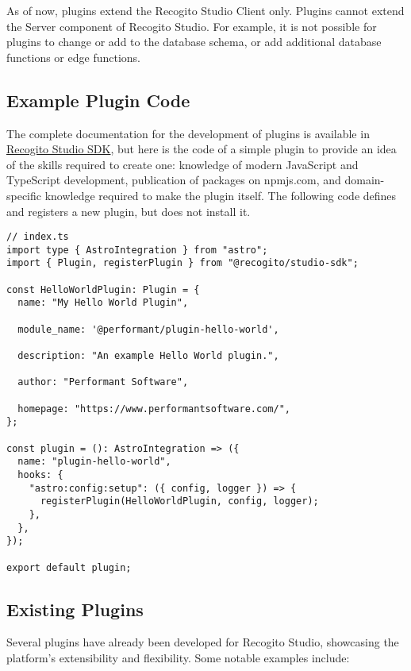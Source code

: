 \documentclass[final]{anthology-ch}         %
\begin{document}
As of now, plugins extend the Recogito Studio Client only. Plugins cannot extend the Server component of Recogito Studio. For example, it is not possible for plugins to change or add to the database schema, or add additional database functions or edge functions.

\subsection{Example Plugin Code} \label{sec:plugins_example}

The complete documentation for the development of plugins is available in \href{https://github.com/recogito/recogito-studio-sdk}{Recogito Studio SDK}, but here is the code of a simple plugin to provide an idea of the skills required to create one: knowledge of modern JavaScript and TypeScript development, publication of packages on npmjs.com, and domain-specific knowledge required to make the plugin itself. The following code defines and registers a new plugin, but does not install it.

\begin{verbatim}
// index.ts
import type { AstroIntegration } from "astro";
import { Plugin, registerPlugin } from "@recogito/studio-sdk";

const HelloWorldPlugin: Plugin = {
  name: "My Hello World Plugin",

  module_name: '@performant/plugin-hello-world',

  description: "An example Hello World plugin.",

  author: "Performant Software",

  homepage: "https://www.performantsoftware.com/",
};

const plugin = (): AstroIntegration => ({
  name: "plugin-hello-world",
  hooks: {
    "astro:config:setup": ({ config, logger }) => {
      registerPlugin(HelloWorldPlugin, config, logger);
    },
  },
});

export default plugin;
\end{verbatim}

\subsection{Existing Plugins} \label{sec:plugins_existing}

Several plugins have already been developed for Recogito Studio, showcasing the platform's extensibility and flexibility. Some notable examples include:
\end{document}
